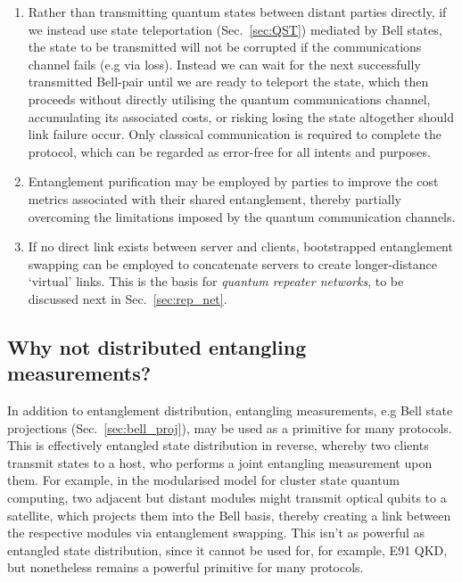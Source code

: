 \begin{enumerate}
\item Rather than transmitting quantum states between distant parties directly, if we instead use state teleportation (Sec.~\ref{sec:QST}) mediated by Bell states, the state to be transmitted will not be corrupted if the communications channel fails (e.g via loss). Instead we can wait for the next successfully transmitted Bell-pair until we are ready to teleport the state, which then proceeds without directly utilising the quantum communications channel, accumulating its associated costs, or risking losing the state altogether should link failure occur. Only classical communication is required to complete the protocol, which can be regarded as error-free for all intents and purposes.
\item Entanglement purification may be employed by parties to improve the cost metrics associated with their shared entanglement, thereby partially overcoming the limitations imposed by the quantum communication channels.
\item If no direct link exists between server and clients, bootstrapped entanglement swapping can be employed to concatenate servers to create longer-distance `virtual' links. This is the basis for \textit{quantum repeater networks}, to be discussed next in Sec.~\ref{sec:rep_net}.
\end{enumerate}


%
%

\subsection{Why not distributed entangling measurements?}

In addition to entanglement distribution, entangling measurements, e.g Bell state projections (Sec.~\ref{sec:bell_proj}), may be used as a primitive for many protocols. This is effectively entangled state distribution in reverse, whereby two clients transmit states to a host, who performs a joint entangling measurement upon them. For example, in the modularised model for cluster state quantum computing, two adjacent but distant modules might transmit optical qubits to a satellite, which projects them into the Bell basis, thereby creating a link between the respective modules via entanglement swapping. This isn't as powerful as entangled state distribution, since it cannot be used for, for example, E91 QKD, but nonetheless remains a powerful primitive for many protocols.

